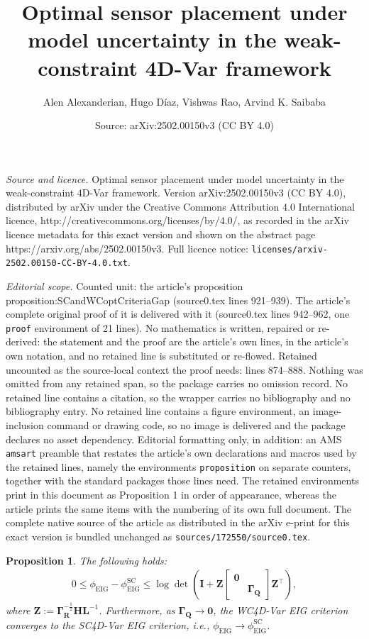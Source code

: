 \documentclass[10pt,a4paper]{amsart}
\title{Optimal sensor placement under model uncertainty in the weak-constraint 4D-Var framework}
\author{Alen Alexanderian, Hugo D\'iaz, Vishwas Rao, Arvind K. Saibaba}
\date{Source: arXiv:2502.00150v3 (CC BY 4.0)}
\newtheorem{proposition}{Proposition}
\newcommand{\Gmeas}{\bm{\Gamma}_{\bm R}}
\newcommand{\Gq}{\bm \Gamma_{\bm Q}}
\newcommand{\I}{{\mathbf{I}}}
\renewcommand{\L}{\mathbf{L}}
\renewcommand{\O}{{\mathbf{H}}}
\newcommand{\Z}{{\mathbf{Z}}}
\newcommand{\criteria}{\phi_\text{EIG}}
\newcommand{\logdet}{{\log\!\det}}
\renewcommand{\t}{{}^\top}
\begin{document}
\maketitle

\noindent\emph{Source and licence.} Optimal sensor placement under model uncertainty in the weak-constraint 4D-Var framework. Version arXiv:2502.00150v3 (CC BY 4.0), distributed by arXiv under the Creative Commons Attribution 4.0 International licence, http://creativecommons.org/licenses/by/4.0/, as recorded in the arXiv licence metadata for this exact version and shown on the abstract page https://arxiv.org/abs/2502.00150v3. Full licence notice: \texttt{licenses/arxiv-2502.00150-CC-BY-4.0.txt}.\par\smallskip

\noindent\textit{Editorial scope.} Counted unit: the article's proposition proposition:SCandWCoptCriteriaGap (source0.tex lines 921--939). The article's complete original proof of it is delivered with it (source0.tex lines 942--962, one \texttt{proof} environment of 21 lines). No mathematics is written, repaired or re-derived: the statement and the proof are the article's own lines, in the article's own notation, and no retained line is substituted or re-flowed.  Retained uncounted as the source-local context the proof needs: lines 874--888.  Nothing was omitted from any retained span, so the package carries no omission record.  No retained line contains a citation, so the wrapper carries no bibliography and no bibliography entry.  No retained line contains a figure environment, an image-inclusion command or drawing code, so no image is delivered and the package declares no asset dependency.  Editorial formatting only, in addition: an AMS \texttt{amsart} preamble that restates the article's own declarations and macros used by the retained lines, namely the environments \texttt{proposition} on separate counters, together with the standard packages those lines need.  The retained environments print in this document as Proposition 1 in order of appearance, whereas the article prints the same items with the numbering of its own full document.  The complete native source of the article as distributed in the arXiv e-print for this exact version is bundled unchanged as \texttt{sources/172550/source0.tex}.
\begin{proposition}\label{proposition:bound_SCandWCoptCriteria}
The following holds: 
\begin{align} \label{eq:gapEIG_SC_WC}
    0\leq \criteria  -   \criteria^\text{SC} 
      \leq \logdet \left( \I+ \bm Z
\begin{bmatrix}
 \bm 0 &    \\
   &   \Gq
\end{bmatrix}
\bm Z\t\right),
\end{align}
where $\Z := \Gmeas^{-\frac 12} \O \L^{-1}$.
Furthermore, as $\Gq \to \bm{0}$, the WC4D-Var EIG criterion converges to the SC4D-Var EIG criterion, i.e., $\criteria \to \criteria^\text{SC}$.

\end{proposition}
\end{document}

